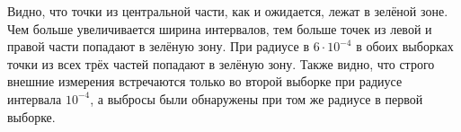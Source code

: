 Видно, что точки из центральной части, как и ожидается, лежат в зелёной зоне. Чем больше увеличивается ширина интервалов, тем больше точек из левой и правой части попадают в зелёную зону. При радиусе в $6 \cdot 10 ^ {-4}$ в обоих выборках точки из всех трёх частей попадают в зелёную зону.
Также видно, что строго внешние измерения встречаются только во второй выборке при радиусе интервала $10 ^ {-4}$, а выбросы были обнаружены при том же радиусе в первой выборке.
